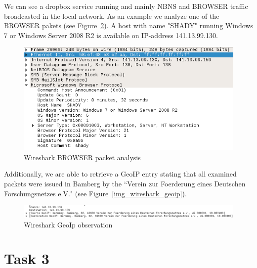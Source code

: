 \documentclass[12pt]{article}
\begin{document}

We can see a dropbox service running and mainly NBNS and BROWSER traffic broadcasted in the local network. As an example we analyze one of the BROWSER pakets (see Figure~\ref{img_wireshark_browser}).
A host with name "SHADY" running Windows 7 or Windows Server 2008 R2 is available on IP-address 141.13.99.130.

\begin{figure}[h]%
\centering%
\includegraphics[width=\textwidth]{images/wireshark_browser.png}%
\caption{Wireshark BROWSER packet analysis}%
\label{img_wireshark_browser}%
\end{figure}%

Additionally, we are able to retrieve a GeoIP entry stating that all examined packets were issued in Bamberg by the ``Verein zur Foerderung eines Deutschen Forschungsnetzes e.V." (see Figure~\ref{img_wireshark_geoip}).

\begin{figure}[h]%
\centering%
\includegraphics[width=\textwidth]{images/wireshark_geoip.png}%
\caption{Wireshark GeoIp observation}%
\label{img_wireshark_browser}%
\end{figure}%


\section{Task 3}\label{task3}
\end{document}
